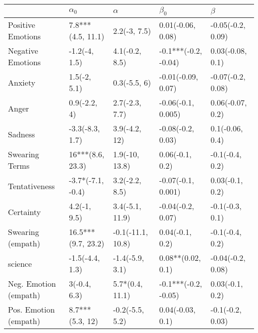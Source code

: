 \begin{tabular}{lllll}
\toprule
{} &          $\alpha_0$ &           $\alpha$ &             $\beta_0$ &            $\beta$ \\
\midrule
Positive Emotions     &   7.8***(4.5, 11.1) &       2.2(-3, 7.5) &     0.01(-0.06, 0.08) &  -0.05(-0.2, 0.09) \\
Negative Emotions     &       -1.2(-4, 1.5) &     4.1(-0.2, 8.5) &  -0.1***(-0.2, -0.04) &   0.03(-0.08, 0.1) \\
Anxiety               &        1.5(-2, 5.1) &       0.3(-5.5, 6) &    -0.01(-0.09, 0.07) &  -0.07(-0.2, 0.08) \\
Anger                 &        0.9(-2.2, 4) &     2.7(-2.3, 7.7) &    -0.06(-0.1, 0.005) &   0.06(-0.07, 0.2) \\
Sadness               &     -3.3(-8.3, 1.7) &      3.9(-4.2, 12) &     -0.08(-0.2, 0.03) &    0.1(-0.06, 0.4) \\
Swearing Terms        &    16***(8.6, 23.3) &     1.9(-10, 13.8) &       0.06(-0.1, 0.2) &    -0.1(-0.4, 0.2) \\
Tentativeness         &   -3.7*(-7.1, -0.4) &     3.2(-2.2, 8.5) &    -0.07(-0.1, 0.001) &    0.03(-0.1, 0.2) \\
Certainty             &        4.2(-1, 9.5) &    3.4(-5.1, 11.9) &     -0.04(-0.2, 0.07) &    -0.1(-0.3, 0.1) \\
Swearing (empath)     &  16.5***(9.7, 23.2) &  -0.1(-11.1, 10.8) &       0.04(-0.1, 0.2) &    -0.1(-0.4, 0.2) \\
science               &     -1.5(-4.4, 1.3) &    -1.4(-5.9, 3.1) &     0.08**(0.02, 0.1) &  -0.04(-0.2, 0.08) \\
Neg. Emotion (empath) &        3(-0.4, 6.3) &    5.7*(0.4, 11.1) &  -0.1***(-0.2, -0.05) &    0.03(-0.1, 0.2) \\
Pos. Emotion (empath) &     8.7***(5.3, 12) &    -0.2(-5.5, 5.2) &      0.04(-0.03, 0.1) &   -0.1(-0.2, 0.03) \\
\bottomrule
\end{tabular}
